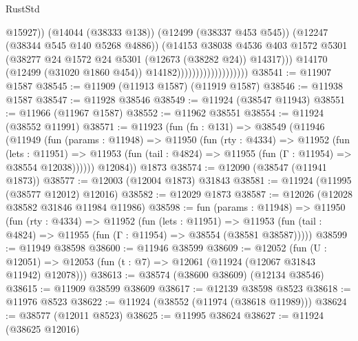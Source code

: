 \begin{lexlean}{RustStd}
\begin{coremodule}
{\begin{coremodule}
{{{{{{{{{{{{{{{{{{{{{{{{{{{{{{{{{{{{{{{{{{{{{{{{{{{{{{{{{{{{{{{{{{{{{{{{{{{{{{{{                                                @15927))
                                            (@14044 (@38333 @138))
                                            (@12499 (@38337 @453 @545))
                                            (@12247 (@38344 @545 @140 @5268 @4886))
                                            (@14153
                                              @38038
                                              @4536
                                              @403
                                              @1572
                                              @5301
                                              (@38277
                                                @24
                                                @1572
                                                @24
                                                @5301
                                                (@12673 (@38282 @24))
                                                @14317)))
                                          @14170
                                          (@12499 (@31020 @1860 @454))
                                          @14182)))))))))))))))))))
@38541 := @11907 @1587
@38545 := @11909 (@11913 @1587) (@11919 @1587)
@38546 := @11938 @1587
@38547 := @11928 @38546
@38549 := @11924 (@38547 @11943)
@38551 := @11966 (@11967 @1587)
@38552 := @11962 @38551
@38554 := @11924 (@38552 @11991)
@38571 := @11923
    (fun (fn : @131) =>
    @38549
      (@11946
        (@11949
          (fun (params : @11948) =>
          @11950
            (fun (rty : @4334) =>
            @11952
              (fun (lets : @11951) =>
              @11953 (fun (tail : @4824) => @11955 (fun (Γ : @11954) => @38554 @12038))))))
        @12084))
    @1873
@38574 := @12090 (@38547 (@11941 @1873))
@38577 := @12003 (@12004 @1873) @31843
@38581 := @11924 (@11995 (@38577 @12012) @12016)
@38582 := @12029 @1873
@38587 := @12026 (@12028 @38582 @31846 @11984 @11986)
@38598 := fun (params : @11948) =>
  @11950
    (fun (rty : @4334) =>
    @11952
      (fun (lets : @11951) =>
      @11953 (fun (tail : @4824) => @11955 (fun (Γ : @11954) => @38554 (@38581 @38587)))))
@38599 := @11949 @38598
@38600 := @11946 @38599
@38609 := @12052
    (fun (U : @12051) => @12053 (fun (t : @7) => @12061 (@11924 (@12067 @31843 @11942) @12078)))
@38613 := @38574 (@38600 @38609) (@12134 @38546)
@38615 := @11909 @38599 @38609
@38617 := @12139 @38598 @8523
@38618 := @11976 @8523
@38622 := @11924 (@38552 (@11974 (@38618 @11989)))
@38624 := @38577 (@12011 @8523)
@38625 := @11995 @38624
@38627 := @11924 (@38625 @12016)
}}}}}}}}}}}}}}}}}}}}}}}}}}}}}}}}}}}}}}}}}}}}}}}}}}}}}}}}}}}}}}}}}}}}}}}}}}}}}}}}
\end{coremodule}}
\end{coremodule}
\end{lexlean}
